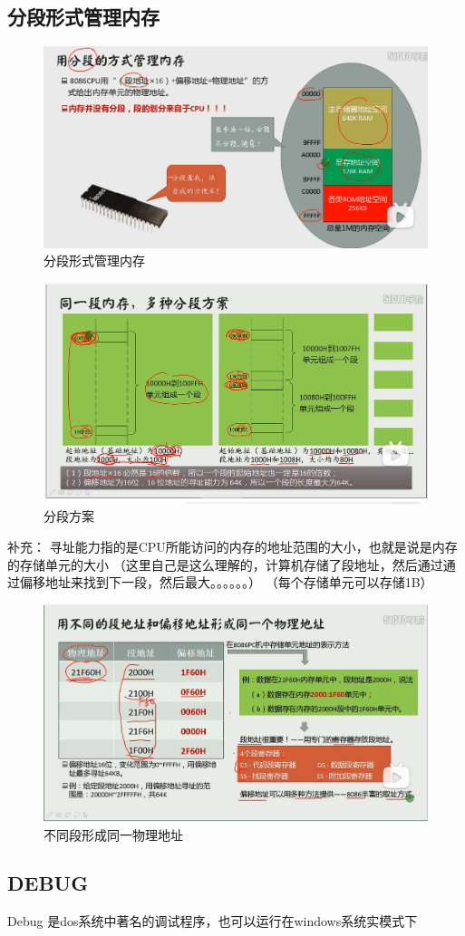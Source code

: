 \documentclass[12pt]{ctexart}
\begin{document}
\subsection{分段形式管理内存}
\begin{figure}[htbp]
    \centering
    \includegraphics[scale=0.6]{分段形式管理内存.png}
    \caption{分段形式管理内存}
    \end{figure} 
\begin{figure}[htbp]
        \centering
        \includegraphics[scale=0.6]{分段方案.png}
        \caption{分段方案}
        \end{figure} 
补充：   寻址能力指的是CPU所能访问的内存的地址范围的大小，也就是说是内存的存储单元的大小
（这里自己是这么理解的，计算机存储了段地址，然后通过通过偏移地址来找到下一段，然后最大。。。。。。）
（每个存储单元可以存储1B）
\begin{figure}[htbp]
    \centering
    \includegraphics[scale=0.6]{不同形成同一.png}
    \caption{不同段形成同一物理地址}
    \end{figure} 
\subsection{DEBUG}
Debug 是dos系统中著名的调试程序，也可以运行在windows系统实模式下
\end{document}
